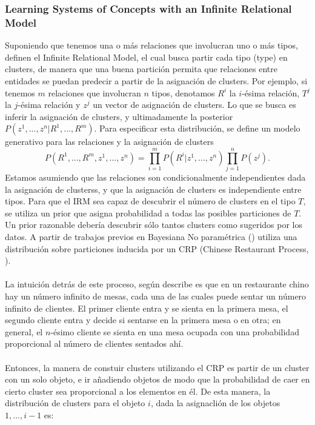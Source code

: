 \documentclass[11pt]{article}
\theoremstyle{plain}
\begin{document}
\subsubsection{Learning Systems of Concepts with an Infinite Relational Model}
Suponiendo que tenemos una o más relaciones que involucran uno o más tipos, \cite{kemp2006learning} definen el Infinite Relational Model, el cual busca partir cada tipo (type) en clusters, de manera que una buena partición permita que relaciones entre entidades se puedan predecir a partir de la asignación de clusters. Por ejemplo, si tenemos $m$ relaciones que involucran $n$ tipos, denotamos $R^i$ la $i$-ésima relación, $T^j$ la $j$-ésima relación y $z^j$ un vector de asignación de clusters. Lo que se busca es inferir la asignación de clusters, y ultimadamente la posterior $P(z^1,...,z^n | R^1, ... , R^m)$. Para especificar esta distribución, se define un modelo generativo para las relaciones y la asignación de clusters
\[ P(R^1,...,R^m, z^1,...,z^n) = \prod_{i=1}^m P(R^i | z^1 , ... , z^n) \prod_{j=1}^n P(z^j). \]
Estamos asumiendo que las relaciones son condicionalmente independientes dada la asignación de clusterss, y que la asignación de clusters es independiente entre tipos. Para que el IRM sea capaz de descubrir el número de clusters en el tipo $T$, se utiliza un prior que asigna probabilidad a todas las posibles particiones de $T$. Un prior razonable debería descubrir sólo tantos clusters como sugeridos por los datos. A partir de trabajos previos en Bayesiana No paramétrica (\cite{rasmussen2000infinite}) utiliza una distribución sobre particiones inducida por un CRP  (Chinese Restaurant Process, \cite{teh2011dirichlet}).\\
\\
La intuición detrás de este proceso, según describe \cite{teh2011dirichlet} es que en un restaurante chino hay un número infinito de mesas, cada una de las cuales puede sentar un número infinito de clientes. El primer cliente entra y se sienta en la primera mesa, el segundo cliente entra y decide si sentarse en la primera mesa o en otra; en general, el $n$-ésimo cliente se sienta en una mesa ocupada con una probabilidad proporcional al número de clientes sentados ahí.\\
\\
Entonces, la manera de constuir clusters utilizando el CRP es partir de un cluster con un solo objeto, e ir añadiendo objetos de modo que la probabilidad de caer en cierto cluster sea proporcional a los elementos en él. De esta manera, la distribución de clusters para el objeto $i$, dada la asignaclión de los objetos $1,...,i-1$ es:
\end{document}
